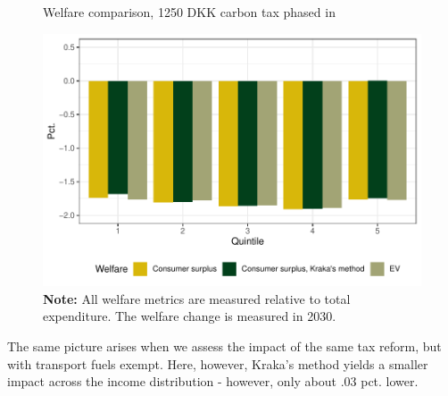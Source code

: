 \begin{figure}[H]
\centering
\caption{Welfare comparison, 1250 DKK carbon tax phased in}
\label{krakasamlign1}
\includegraphics[width=.7\textwidth]{Figures/IO-resultater/bar_sammenlign_indfas.pdf}
\captionsetup{singlelinecheck=off,size=scriptsize}
\setlength{\captionmargin}{10pt}
\caption*{
\textbf{Note:} All welfare metrics are measured relative to total expenditure. The welfare change is measured in 2030.\\}
\end{figure}

The same picture arises when we assess the impact of the same tax reform, but with transport fuels exempt. Here, however, Kraka's method yields a smaller impact across the income distribution - however, only about .03 pct. lower. 

